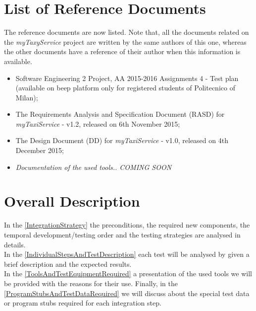 \documentclass[\mainpath/main]{subfiles}
\begin{document}
\section{List of Reference Documents}
\label{Introduction:ReferenceDocuments}
The reference documents are now listed. Note that, all the documents related on the \textit{myTaxyService} project are written by the same authors of this one, whereas the other documents have a reference of their author when this information is available.\\
\begin{itemize}
	\item Software Engineering 2 Project, AA 2015-2016 Assignments 4 - Test plan (available on beep platform only for registered students of Politecnico of Milan);
	\item The Requirements Analysis and Specification Document (RASD) for \textit{myTaxiService} - v1.2, released on 6th November 2015;
	\item The Design Document (DD) for \textit{myTaxiService} - v1.0, released on 4th December 2015;
	\item \textit{Documentation of the used tools.. COMING SOON}
\end{itemize}

\section{Overall Description}
\label{Introduction:Overall}
In the \autoref{IntegrationStrategy} the preconditions, the required new components, the temporal development/testing order and the testing strategies are analysed in details.\\
In the \autoref{IndividualStepsAndTestDescription} each test will be analysed by given a brief description and the expected results.\\
In the \autoref{ToolsAndTestEquipmentRequired} a presentation of the used tools we will be provided with the reasons for their use. Finally, in the \autoref{ProgramStubsAndTestDataRequired} we will discuss about the special test data or program stubs required for each integration step.
\end{document}
